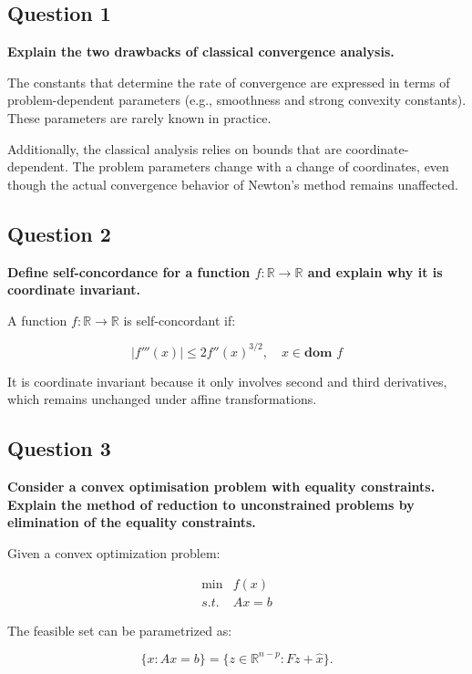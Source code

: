 

\subsection*{Question 1}
\textbf{Explain the two drawbacks of classical convergence analysis.}

The constants that determine the rate of convergence are expressed in terms of problem-dependent parameters (e.g., smoothness and strong convexity constants). These parameters are rarely known in practice.  

Additionally, the classical analysis relies on bounds that are coordinate-dependent. The problem parameters change with a change of coordinates, even though the actual convergence behavior of Newton's method remains unaffected. 

\subsection*{Question 2}
\textbf{Deﬁne self-concordance for a function $ f : \mathbb{R} \to \mathbb{R}$ and explain why it is coordinate invariant.}

A function \( f: \mathbb{R} \to \mathbb{R} \) is self-concordant if:  

\[
| f'''(x) | \leq 2 f''(x)^{3/2}, \quad x \in \textbf{dom }f
\]

It is coordinate invariant because it only involves second and third derivatives, which remains unchanged under affine transformations. 


\subsection*{Question 3}
\textbf{Consider a convex optimisation problem with equality constraints. Explain the method of reduction to unconstrained problems by elimination of the equality constraints.}

Given a convex optimization problem:

$$
\begin{array}{ll}
\min & f(x) \\
s.t. & Ax=b
\end{array}
$$

The feasible set can be parametrized as: 

$$
\{x:Ax=b\} = \{z\in\mathbb{R}^{n-p}:Fz + \hat x\}.
$$

